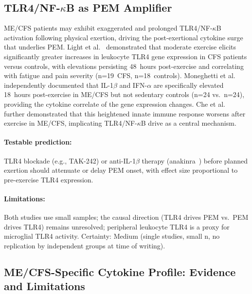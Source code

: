 \subsection{TLR4/NF-$\kappa$B as PEM Amplifier}

\begin{hypothesis}
\label{hyp:tlr4-nfkb-pem-amplifier}
ME/CFS patients may exhibit exaggerated and prolonged TLR4/NF-$\kappa$B activation following physical exertion, driving the post-exertional cytokine surge that underlies PEM. Light et al.~\cite{Light2009} demonstrated that moderate exercise elicits significantly greater increases in leukocyte TLR4 gene expression in CFS patients versus controls, with elevations persisting 48~hours post-exercise and correlating with fatigue and pain severity (n=19~CFS, n=18~controls). Moneghetti et al.~\cite{Moneghetti2018} independently documented that IL-1$\beta$ and IFN-$\alpha$ are specifically elevated 18~hours post-exercise in ME/CFS but not sedentary controls (n=24 vs.~n=24), providing the cytokine correlate of the gene expression changes. Che et al.~\cite{Che2025} further demonstrated that this heightened innate immune response worsens after exercise in ME/CFS, implicating TLR4/NF-$\kappa$B drive as a central mechanism.

\paragraph{Testable prediction:} TLR4 blockade (e.g., TAK-242) or anti-IL-1$\beta$ therapy (anakinra~\cite{Roerink2017anakinra}) before planned exertion should attenuate or delay PEM onset, with effect size proportional to pre-exercise TLR4 expression.

\paragraph{Limitations:} Both studies use small samples; the causal direction (TLR4 drives PEM vs.~PEM drives TLR4) remains unresolved; peripheral leukocyte TLR4 is a proxy for microglial TLR4 activity. Certainty: Medium (single studies, small n, no replication by independent groups at time of writing).
\end{hypothesis}

\subsection{ME/CFS-Specific Cytokine Profile: Evidence and Limitations}

